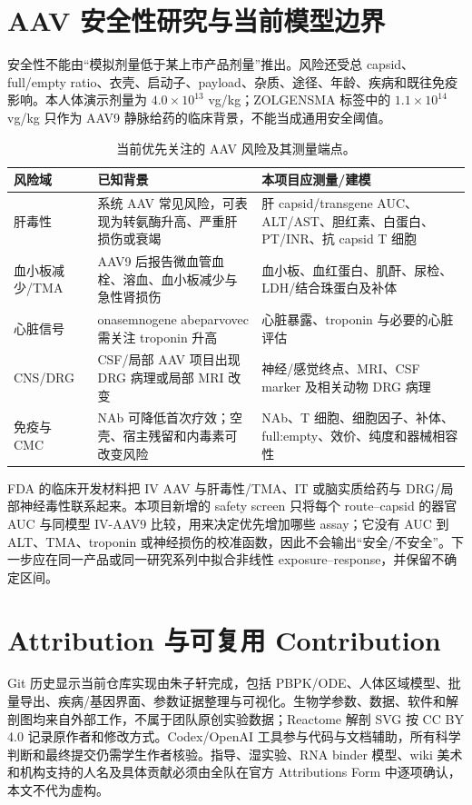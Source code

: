 \documentclass[UTF8,11pt,a4paper]{ctexart}
\begin{document}
\section{AAV 安全性研究与当前模型边界}

安全性不能由“模拟剂量低于某上市产品剂量”推出。风险还受总 capsid、full/empty ratio、衣壳、启动子、payload、杂质、途径、年龄、疾病和既往免疫影响。本人体演示剂量为 $4.0\times10^{13}$ vg/kg；ZOLGENSMA 标签中的 $1.1\times10^{14}$ vg/kg 只作为 AAV9 静脉给药的临床背景，不能当成通用安全阈值\cite{zolgensma2026}。

\begin{table}[H]
\centering
\caption{当前优先关注的 AAV 风险及其测量端点。}
\begin{tabularx}{\textwidth}{p{}p{}X}
\toprule
风险域 & 已知背景 & 本项目应测量/建模 \\
\midrule
肝毒性 & 系统 AAV 常见风险，可表现为转氨酶升高、严重肝损伤或衰竭 & 肝 capsid/transgene AUC、ALT/AST、胆红素、白蛋白、PT/INR、抗 capsid T 细胞 \\
血小板减少/TMA & AAV9 后报告微血管血栓、溶血、血小板减少与急性肾损伤 & 血小板、血红蛋白、肌酐、尿检、LDH/结合珠蛋白及补体 \\
心脏信号 & onasemnogene abeparvovec 需关注 troponin 升高 & 心脏暴露、troponin 与必要的心脏评估 \\
CNS/DRG & CSF/局部 AAV 项目出现 DRG 病理或局部 MRI 改变 & 神经/感觉终点、MRI、CSF marker 及相关动物 DRG 病理 \\
免疫与 CMC & NAb 可降低首次疗效；空壳、宿主残留和内毒素可改变风险 & NAb、T 细胞、细胞因子、补体、full:empty、效价、纯度和器械相容性 \\
\bottomrule
\end{tabularx}
\end{table}

FDA 的临床开发材料把 IV AAV 与肝毒性/TMA、IT 或脑实质给药与 DRG/局部神经毒性联系起来\cite{fdaaav2023}。本项目新增的 safety screen 只将每个 route--capsid 的器官 AUC 与同模型 IV-AAV9 比较，用来决定优先增加哪些 assay；它没有 AUC 到 ALT、TMA、troponin 或神经损伤的校准函数，因此不会输出“安全/不安全”。下一步应在同一产品或同一研究系列中拟合非线性 exposure--response，并保留不确定区间。

\section{Attribution 与可复用 Contribution}

Git 历史显示当前仓库实现由朱子轩完成，包括 PBPK/ODE、人体区域模型、批量导出、疾病/基因界面、参数证据整理与可视化。生物学参数、数据、软件和解剖图均来自外部工作，不属于团队原创实验数据；Reactome 解剖 SVG 按 CC BY 4.0 记录原作者和修改方式。Codex/OpenAI 工具参与代码与文档辅助，所有科学判断和最终提交仍需学生作者核验。指导、湿实验、RNA binder 模型、wiki 美术和机构支持的人名及具体贡献必须由全队在官方 Attributions Form 中逐项确认，本文不代为虚构。
\end{document}
